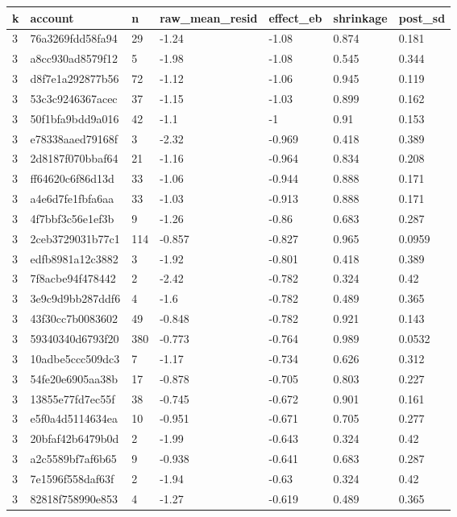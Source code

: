 \begin{tabular}{lllllll}
\toprule
k & account & n & raw\_mean\_resid & effect\_eb & shrinkage & post\_sd \\
\midrule
3 & 76a3269fdd58fa94 & 29 & -1.24 & -1.08 & 0.874 & 0.181 \\
3 & a8cc930ad8579f12 & 5 & -1.98 & -1.08 & 0.545 & 0.344 \\
3 & d8f7e1a292877b56 & 72 & -1.12 & -1.06 & 0.945 & 0.119 \\
3 & 53c3c9246367acec & 37 & -1.15 & -1.03 & 0.899 & 0.162 \\
3 & 50f1bfa9bdd9a016 & 42 & -1.1 & -1 & 0.91 & 0.153 \\
3 & e78338aaed79168f & 3 & -2.32 & -0.969 & 0.418 & 0.389 \\
3 & 2d8187f070bbaf64 & 21 & -1.16 & -0.964 & 0.834 & 0.208 \\
3 & ff64620c6f86d13d & 33 & -1.06 & -0.944 & 0.888 & 0.171 \\
3 & a4e6d7fe1fbfa6aa & 33 & -1.03 & -0.913 & 0.888 & 0.171 \\
3 & 4f7bbf3c56e1ef3b & 9 & -1.26 & -0.86 & 0.683 & 0.287 \\
3 & 2ceb3729031b77c1 & 114 & -0.857 & -0.827 & 0.965 & 0.0959 \\
3 & edfb8981a12c3882 & 3 & -1.92 & -0.801 & 0.418 & 0.389 \\
3 & 7f8acbe94f478442 & 2 & -2.42 & -0.782 & 0.324 & 0.42 \\
3 & 3e9c9d9bb287ddf6 & 4 & -1.6 & -0.782 & 0.489 & 0.365 \\
3 & 43f30cc7b0083602 & 49 & -0.848 & -0.782 & 0.921 & 0.143 \\
3 & 59340340d6793f20 & 380 & -0.773 & -0.764 & 0.989 & 0.0532 \\
3 & 10adbe5ccc509dc3 & 7 & -1.17 & -0.734 & 0.626 & 0.312 \\
3 & 54fe20e6905aa38b & 17 & -0.878 & -0.705 & 0.803 & 0.227 \\
3 & 13855e77fd7ec55f & 38 & -0.745 & -0.672 & 0.901 & 0.161 \\
3 & e5f0a4d5114634ea & 10 & -0.951 & -0.671 & 0.705 & 0.277 \\
3 & 20bfaf42b6479b0d & 2 & -1.99 & -0.643 & 0.324 & 0.42 \\
3 & a2c5589bf7af6b65 & 9 & -0.938 & -0.641 & 0.683 & 0.287 \\
3 & 7e1596f558daf63f & 2 & -1.94 & -0.63 & 0.324 & 0.42 \\
3 & 82818f758990e853 & 4 & -1.27 & -0.619 & 0.489 & 0.365 \\

\end{tabular}
